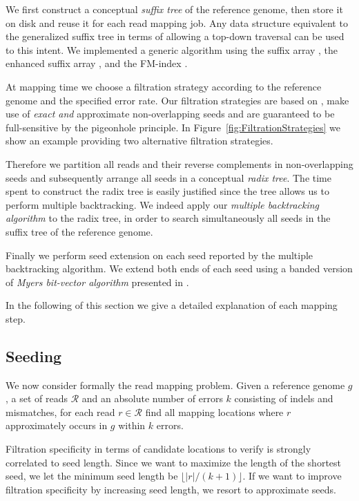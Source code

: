 We first construct a conceptual \emph{suffix tree} of the reference genome, then store it on disk and reuse it for each read mapping job.
Any data structure equivalent to the generalized suffix tree in terms of allowing a top-down traversal can be used to this intent. We implemented a generic algorithm using the suffix array \citep{Manber1990}, the enhanced suffix array \citep{Abouelhoda2004}, and the FM-index \citep{Ferragina2001}.

At mapping time we choose a filtration strategy according to the reference genome and the specified error rate.
Our filtration strategies are based on \citep{Navarro2000}, make use of \emph{exact and} approximate non-overlapping seeds and are guaranteed to be full-sensitive by the pigeonhole principle.
In Figure~\ref{fig:FiltrationStrategies} we show an example providing two alternative filtration strategies.

Therefore we partition all reads and their reverse complements in non-overlapping seeds and subsequently arrange all seeds in a conceptual \emph{radix tree}.
The time spent to construct the radix tree is easily justified since the tree allows us to perform multiple backtracking.
We indeed apply our \emph{multiple backtracking algorithm} to the radix tree, in order to search simultaneously all seeds in the suffix tree of the reference genome.

Finally we perform seed extension on each seed reported by the multiple backtracking algorithm.
We extend both ends of each seed using a banded version of \emph{Myers bit-vector algorithm} \citep{Myers1999} presented in \citep{Razers3}.

In the following of this section we give a detailed explanation of each mapping step.

\subsection{Seeding}

We now consider formally the read mapping problem.
Given a reference genome $g$, a set of reads $\mathcal{R}$ and an absolute number of errors $k$ consisting of indels and mismatches, for each read $r \in \mathcal{R}$ find all mapping locations where $r$ approximately occurs in $g$ within $k$ errors.

Filtration specificity in terms of candidate locations to verify is strongly correlated to seed length.
Since we want to maximize the length of the shortest seed, we let the minimum seed length be $\lfloor |r|/(k+1) \rfloor$.
If we want to improve filtration specificity by increasing seed length, we resort to approximate seeds.


